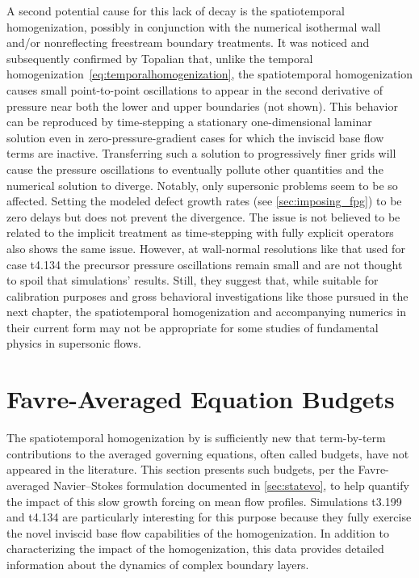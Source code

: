 A second potential cause for this lack of decay is the spatiotemporal
homogenization, possibly in conjunction with the numerical isothermal wall
and/or nonreflecting freestream boundary treatments.
%
It was noticed and subsequently confirmed by Topalian that, unlike
the temporal homogenization~\eqref{eq:temporalhomogenization}, the
spatiotemporal homogenization causes small point-to-point oscillations to appear
in the second derivative of pressure near both the lower and upper boundaries
(not shown).
%
This behavior can be reproduced by time-stepping a stationary one-dimensional
laminar solution even in zero-pressure-gradient cases for which the inviscid
base flow terms are inactive.
%
Transferring such a solution to progressively finer grids will cause the
pressure oscillations to eventually pollute other quantities and the numerical
solution to diverge.
%
Notably, only supersonic problems seem to be so affected.  Setting the modeled
defect growth rates (see \autoref{sec:imposing_fpg}) to be zero delays but does
not prevent the divergence.  The issue is not believed to be related to the
implicit treatment as time-stepping with fully explicit operators also shows
the same issue.
%
However, at wall-normal resolutions like that used for case t4.134 the precursor
pressure oscillations remain small and are not thought to spoil that
simulations' results.
%
Still, they suggest that, while suitable for calibration purposes and gross
behavioral investigations like those pursued in the next chapter, the
spatiotemporal homogenization and accompanying numerics in their current form
may not be appropriate for some studies of fundamental physics in supersonic
flows.

\section{Favre-Averaged Equation Budgets}
\label{sec:bldata_budgets}

The spatiotemporal homogenization by \citet{Topalian2014Spatiotemporal} is
sufficiently new that term-by-term contributions to the averaged governing
equations, often called budgets, have not appeared in the literature.
%
This section presents such budgets, per the Favre-averaged Navier--Stokes
formulation documented in \autoref{sec:statevo}, to help quantify the impact of
this slow growth forcing on mean flow profiles.
%
Simulations t3.199 and t4.134 are particularly interesting for this purpose
because they fully exercise the novel inviscid base flow capabilities of the
homogenization.
%
In addition to characterizing the impact of the homogenization, this data
provides detailed information about the dynamics of complex boundary layers.


